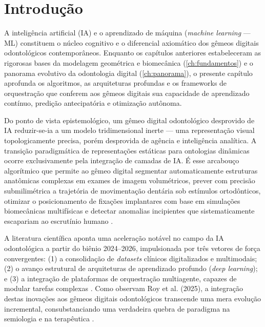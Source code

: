 \section{Introdução}

A inteligência artificial (IA) e o aprendizado de máquina (\textit{machine learning} --- ML) constituem o núcleo cognitivo e o diferencial axiomático dos gêmeos digitais odontológicos contemporâneos. Enquanto os capítulos anteriores estabeleceram as rigorosas bases da modelagem geométrica e biomecânica (\autoref{ch:fundamentos}) e o panorama evolutivo da odontologia digital (\autoref{ch:panorama}), o presente capítulo aprofunda os algoritmos, as arquiteturas profundas e os frameworks de orquestração que conferem aos gêmeos digitais sua capacidade de aprendizado contínuo, predição antecipatória e otimização autônoma. 

Do ponto de vista epistemológico, um gêmeo digital odontológico desprovido de IA reduzir-se-ia a um modelo tridimensional inerte --- uma representação visual topologicamente precisa, porém desprovida de agência e inteligência analítica. A transição paradigmática de representações estáticas para ontologias dinâmicas ocorre exclusivamente pela integração de camadas de IA. É esse arcabouço algorítmico que permite ao gêmeo digital segmentar automaticamente estruturas anatômicas complexas em exames de imagem volumétricos, prever com precisão submilimétrica a trajetória de movimentação dentária sob estímulos ortodônticos, otimizar o posicionamento de fixações implantares com base em simulações biomecânicas multifísicas e detectar anomalias incipientes que sistematicamente escapariam ao escrutínio humano \cite{duggal2026, katsoulakis2024}.

A literatura científica aponta uma aceleração notável no campo da IA odontológica a partir do biênio 2024--2026, impulsionada por três vetores de força convergentes: (1) a consolidação de \textit{datasets} clínicos digitalizados e multimodais; (2) o avanço estrutural de arquiteturas de aprendizado profundo (\textit{deep learning}); e (3) a integração de plataformas de orquestração multiagente, capazes de modular tarefas complexas \cite{khoshfekr2025, menon2026}. Como observam Roy et al. (2025), a integração destas inovações aos gêmeos digitais odontológicos transcende uma mera evolução incremental, consubstanciando uma verdadeira quebra de paradigma na semiologia e na terapêutica \cite{roy2025editorial}.


